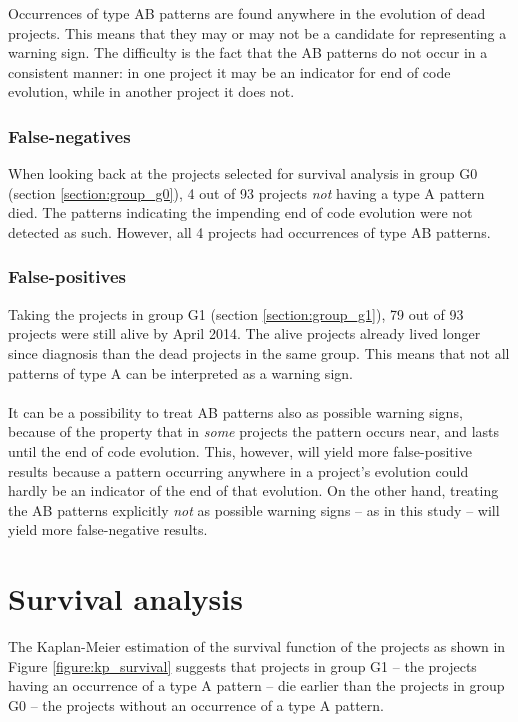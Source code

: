 

\noindent
Occurrences of type AB patterns are found anywhere in the evolution of dead
projects. This means that they may or may not be a candidate for representing a
warning sign. The difficulty is the fact that the AB patterns do not occur in a
consistent manner: in one project it may be an indicator for end of code
evolution, while in another project it does not.

\subsubsection{False-negatives}
When looking back at the projects selected for survival analysis in group G0
(section \ref{section:group_g0}), 4 out of 93 projects \textit{not} having a
type A pattern died. The patterns indicating the impending end of code
evolution were not detected as such. However, all 4 projects had occurrences of
type AB patterns.

\subsubsection{False-positives}
Taking the projects in group G1 (section \ref{section:group_g1}), 79 out of 93
projects were still alive by April 2014. The alive projects already lived
longer since diagnosis than the dead projects in the same group. This means
that not all patterns of type A can be interpreted as a warning sign.

\paragraph{}
It can be a possibility to treat AB patterns also as possible warning signs,
because of the property that in \textit{some} projects the pattern occurs near,
and lasts until the end of code evolution. This, however, will yield more
false-positive results because a pattern occurring anywhere in a project's
evolution could hardly be an indicator of the end of that evolution.
On the other hand, treating the AB patterns explicitly \textit{not} as possible
warning signs -- as in this study -- will yield more false-negative results.

\section{Survival analysis}
\label{section:kp_survival}
The Kaplan-Meier estimation of the survival function of the projects as shown
in Figure \ref{figure:kp_survival} suggests that projects in group G1 -- the
projects having an occurrence of a type A pattern -- die earlier than the
projects in group G0 -- the projects without an occurrence of a type A pattern.

